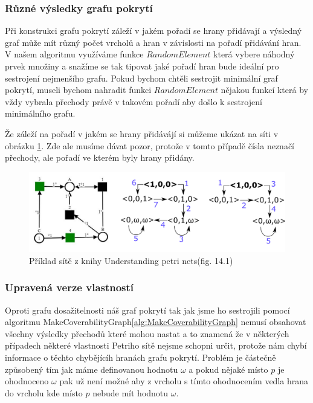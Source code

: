 \documentclass[
  biblatex,
  glossaries,
  index
]{kidiplom}
\begin{document}
\subsubsection{Různé výsledky grafu pokrytí}

Při konstrukci grafu pokrytí záleží v jakém pořadí se hrany přidávají
a výsledný graf může mít různý počet vrcholů a hran 
v závislosti na pořadí přidávání hran.
V našem algoritmu využíváme funkce $RandomElement$ která vybere 
náhodný prvek množiny a snažíme se tak tipovat jaké pořadí hran bude
ideální pro sestrojení nejmenšího grafu. 
Pokud bychom chtěli sestrojit minimální 
graf pokrytí, museli bychom nahradit funkci $RandomElement$ nějakou
funkcí která by vždy vybrala přechody právě 
v takovém pořadí aby došlo k sestrojení minimálního grafu.

Že záleží na pořadí v jakém se hrany přidávájí si můžeme ukázat na 
síti v obrázku \ref{fig:síť různé coverability}. Zde ale musíme 
dávat pozor, protože v tomto případě čísla neznačí přechody,
ale pořadí ve kterém byly hrany přidány.

\begin{figure}[h]
  \centering
  \includegraphics[width=\linewidth]{net_coverability_difference}
  \caption{Příklad sítě z knihy Understanding petri nets\cite{reisig2013understanding}(fig.  14.1) }\label{fig:síť různé coverability}
\end{figure}


\subsubsection{Upravená verze vlastností}

Oproti grafu dosažitelnosti náš graf pokrytí tak jak jsme ho sestrojili 
pomocí algoritmu MakeCoverabilityGraph\ref{alg:MakeCoverabilityGraph} 
nemusí obsahovat všechny výsledky přechodů které mohou nastat a to znamená 
že v některých případech některé vlastnosti Petriho sítě nejsme schopni určit, 
protože nám chybí informace o těchto chybějícíh hranách grafu pokrytí.
Problém je částečně způsobený tím jak máme definovanou hodnotu $\omega$ a pokud 
nějaké místo $p$ je ohodnoceno $\omega$ pak už není možné aby z vrcholu s tímto 
ohodnocením vedla hrana do vrcholu kde místo $p$ nebude mít hodnotu $\omega$.
\end{document}
